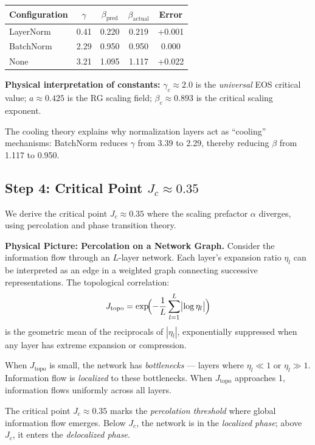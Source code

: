 \documentclass[11pt, a4paper]{article}
\theoremstyle{plain}
\begin{document}
\begin{center}
\begin{tabular}{lcccc}
\toprule
Configuration & $\gamma$ & $\beta_{\mathrm{pred}}$ & $\beta_{\mathrm{actual}}$ & Error \\
\midrule
LayerNorm & 0.41 & 0.220 & 0.219 & +0.001 \\
BatchNorm & 2.29 & 0.950 & 0.950 & 0.000 \\
None & 3.21 & 1.095 & 1.117 & +0.022 \\
\bottomrule
\end{tabular}
\end{center}

\textbf{Physical interpretation of constants:} $\gamma_c \approx 2.0$ is the \emph{universal} EOS critical value; $a \approx 0.425$ is the RG scaling field; $\beta_c \approx 0.893$ is the critical scaling exponent.

The cooling theory explains why normalization layers act as ``cooling'' mechanisms: BatchNorm reduces $\gamma$ from 3.39 to 2.29, thereby reducing $\beta$ from 1.117 to 0.950.

\subsection{Step 4: Critical Point $J_c \approx 0.35$}

We derive the critical point $J_c \approx 0.35$ where the scaling prefactor $\alpha$ diverges, using percolation and phase transition theory.

\medskip\noindent\textbf{Physical Picture: Percolation on a Network Graph.} Consider the information flow through an $L$-layer network. Each layer's expansion ratio $\eta_l$ can be interpreted as an edge in a weighted graph connecting successive representations. The topological correlation:
\begin{equation}
J_{\mathrm{topo}} = \exp\!\Bigl(-\frac{1}{L}\sum_{l=1}^{L}\bigl|\log \eta_l\bigr|\Bigr)
\end{equation}
is the geometric mean of the reciprocals of $|\eta_l|$, exponentially suppressed when any layer has extreme expansion or compression.

When $J_{\mathrm{topo}}$ is small, the network has \emph{bottlenecks} --- layers where $\eta_l \ll 1$ or $\eta_l \gg 1$. Information flow is \emph{localized} to these bottlenecks. When $J_{\mathrm{topo}}$ approaches 1, information flows uniformly across all layers.

The critical point $J_c \approx 0.35$ marks the \emph{percolation threshold} where global information flow emerges. Below $J_c$, the network is in the \emph{localized phase}; above $J_c$, it enters the \emph{delocalized phase}.
\end{document}

